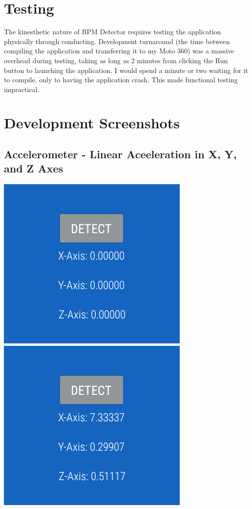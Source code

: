 \documentclass[12pt]{article}
\begin{document}
\section{Testing}
The kinesthetic nature of BPM Detector requires testing the application physically through conducting. Development turnaround (the time between compiling the application and transferring it to my Moto 360) was a massive overhead during testing, taking as long as 2 minutes from clicking the Run button to launching the application. I would spend a minute or two waiting for it to compile, only to having the application crash. This made functional testing impractical.

\section{Development Screenshots}
\subsection{Accelerometer - Linear Aceeleration in X, Y, and Z Axes}
\begin{center}
\includegraphics[width=.4\textwidth]{bpm1.png}
\includegraphics[width=.4\textwidth]{bpm2.png}
\end{center}
\end{document}
